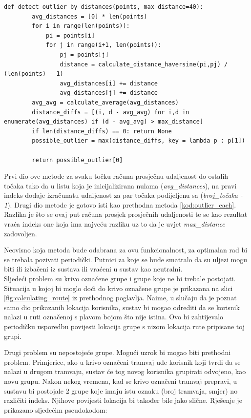 \documentclass[times, utf8, diplomski]{fer}
\begin{document}
\begin{lstlisting}[caption={Otkrivanje \emph{outliera} - međusobne udaljenosti},captionpos=b,label={kod:outlier_each}]
    def detect_outlier_by_distances(points, max_distance=40):
        avg_distances = [0] * len(points)
        for i in range(len(points)):
            pi = points[i]
            for j in range(i+1, len(points)):
                pj = points[j]
                distance = calculate_distance_haversine(pi,pj) / (len(points) - 1)
                avg_distances[i] += distance
                avg_distances[j] += distance
        avg_avg = calculate_average(avg_distances)
        distance_diffs = [(i, d - avg_avg) for i,d in enumerate(avg_distances) if (d - avg_avg) > max_distance]
        if len(distance_diffs) == 0: return None
        possible_outlier = max(distance_diffs, key = lambda p : p[1])

        return possible_outlier[0]

\end{lstlisting}
Prvi dio ove metode za svaku točku računa prosječnu udaljenost do ostalih točaka tako da u listu koja je inicijalizirana nulama (\emph{avg\_distances}), na pravi indeks dodaje izračunatu udaljenost za par točaka podijeljenu sa (\emph{broj\_točaka - 1}). Drugi dio metode je gotovo isti kao prethodna metoda \ref{kod:outlier_each}. Razlika je što se ovaj put računa prosjek prosječnih udaljenosti te se kao rezultat vraća indeks one koja ima najveću razliku uz to da je uvjet \emph{max\_distance} zadovoljen.

Neovisno koja metoda bude odabrana za ovu funkcionalnost, za optimalan rad bi se trebala pozivati periodički. Putnici za koje se bude smatralo da su uljezi mogu biti ili izbačeni iz sustava ili vraćeni u sustav kao neutralni.\\


Sljedeći problem su krivo označene grupe i grupe koje ne bi trebale postojati. Situacija u kojoj bi moglo doći do krivo označene grupe je prikazana na slici \ref{fig:calculating_route} iz prethodnog poglavlja. Naime, u slučaju da je poznat samo dio prikazanih lokacija korisnika, sustav bi mogao odrediti da se korisnik nalazi u ruti označenoj s plavom bojom što nije istina. Ovo bi zahtijevalo periodičku usporedbu povijesti lokacija grupe s nizom lokacija rute pripisane toj grupi. 

Drugi problem su nepostojeće grupe. Mogući uzrok bi mogao biti prethodni problem. Primjerice, ako u krivo označeni tramvaj uđe korisnik koji tvrdi da se nalazi u drugom tramvaju, sustav će tog novog korisnika grupirati odvojeno, kao novu grupu. Nakon nekog vremena, kad se krivo označeni tramvaj prepravi, u sustavu bi postojale 2 grupe koje imaju istu oznaku (broj tramvaja, smjer) no različiti indeks. Njihove povijesti lokacija bi također bile jako slične. Rješenje je prikazano sljedećim pseudokodom:
\end{document}
